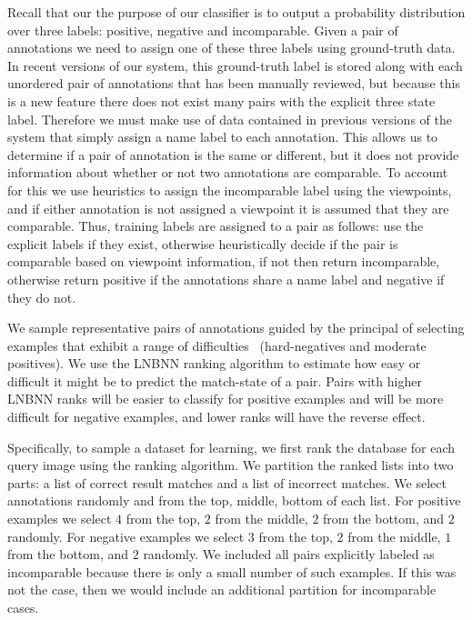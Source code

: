 Recall that our the purpose of our classifier is to output a probability distribution over three labels:
positive, negative and incomparable.
Given a pair of annotations we need to assign one of these three labels using ground-truth data.
In recent versions of our system, this ground-truth label is stored along with each unordered pair of annotations
  that has been manually reviewed, but because this is a new feature there does not exist many pairs with the
  explicit three state label.
Therefore we must make use of data contained in previous versions of the system that simply assign a name label
  to each annotation.
This allows us to determine if a pair of annotation is the same or different, but it does not provide information
  about whether or not two annotations are comparable.
To account for this we use heuristics to assign the incomparable label using the viewpoints, and if either
  annotation is not assigned a viewpoint it is assumed that they are comparable.
Thus, training labels are assigned to a pair as follows:
use the explicit labels if they exist, otherwise heuristically decide if the pair is comparable based on
  viewpoint information, if not then return incomparable, otherwise return positive if the annotations share a name
  label and negative if they do not.

We sample representative pairs of annotations guided by the principal of selecting examples that exhibit a range
  of difficulties~\cite{shi_embedding_2016} (\eg hard-negatives and moderate positives).
We use the LNBNN ranking algorithm to estimate how easy or difficult it might be to predict the match-state of a
  pair.
Pairs with higher LNBNN ranks will be easier to classify for positive examples and will be more difficult for
  negative examples, and lower ranks will have the reverse effect.


Specifically, to sample a dataset for learning, we first rank the database for each query image using the ranking
  algorithm.
We partition the ranked lists into two parts:
a list of correct result matches and a list of incorrect matches.
We select annotations randomly and from the top, middle, bottom of each list.
For positive examples we select $4$ from the top, $2$ from the middle, $2$ from the bottom, and $2$ randomly.
For negative examples we select $3$ from the top, $2$ from the middle, $1$ from the bottom, and $2$ randomly.
We included all pairs explicitly labeled as incomparable because there is only a small number of such examples.
If this was not the case, then we would include an additional partition for incomparable cases.

